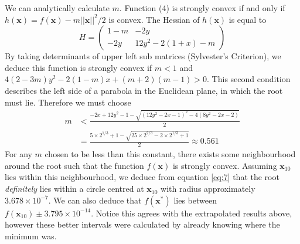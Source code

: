\documentclass[10pt,a4paper,notitlepage]{article}
\newcommand{\abs}[1]{\lvert#1\rvert}
\newcommand{\x}{\mathbf{x}}
\begin{document}
We can analytically calculate $m$. Function (4) is strongly convex if and only if $h(\x)=f(\x)-m\abs{\abs{\x}}^{2}/2$ is convex. The Hessian of $h(\x)$ is equal to
\begin{equation}
H= \begin{pmatrix}
1-m & -2y \\
-2y & 12y^{2}-2(1+x)-m
\end{pmatrix}
\end{equation}
By taking determinants of upper left sub matrices (Sylvester's Criterion), we deduce this function is strongly convex if $m<1$ and $4(2-3m)y^{2}-2(1-m)x+(m+2)(m-1)>0$. This second condition describes the left side of a parabola in the Euclidean plane, in which the root must lie. Therefore we must choose
\begin{equation}
\begin{aligned}
m &<\frac{-2x+12y^{2}-1-\sqrt{\left(12y^{2}-2x-1\right)^{2}-4\left(8y^{2}-2x-2\right)}}{2}\\
&=\frac{5\times 2^{1/3}+1-\sqrt{25\times 2^{2/3}-2\times 2^{1/3}+1}}{2}\approx 0.561
\end{aligned}
\end{equation}
For any $m$ chosen to be less than this constant, there exists some neighbourhood around the root such that the function $f(\x)$ is strongly convex. Assuming $\x_{10}$ lies within this neighbourhood, we deduce from equation \eqref{eq:7} that the root \textit{definitely} lies within a circle centred at $\x_{10}$ with radius approximately $3.678\times 10^{-7}$. We can also deduce that $f(\x^{*})$ lies between $f(\x_{10})\pm 3.795\times 10^{-14}$. Notice this agrees with the extrapolated results above, however these better intervals were calculated by already knowing where the minimum was.
\end{document}
